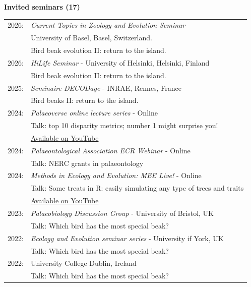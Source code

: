 \documentclass[10pt,a4paper]{article}
\begin{document}
{\raggedright\textbf{Invited seminars (17)}\\[1.5ex]
\begin{tabular}{ll}
2026: & \textit{Current Topics in Zoology and Evolution Seminar} \\
      & University of Basel, Basel, Switzerland. \\
      & Bird beak evolution II: return to the island.\\
2026: & \textit{HiLife Seminar} - University of Helsinki, Helsinki, Finland \\
      & Bird beak evolution II: return to the island.\\
2025: & \textit{Seminaire DECODage} - INRAE, Rennes, France \\
      & Bird beaks II: return to the island.\\
2024: & \textit{Palaeoverse online lecture series} - Online \\
      & Talk: top 10 disparity metrics; number 1 might surprise you!\\
      & \href{https://www.youtube.com/watch?v=JKpUQbxID9A}{Available on YouTube}\\
2024: & \textit{Palaeontological Association ECR Webinar} - Online \\
      & Talk: NERC grants in palaeontology\\
2024: & \textit{Methods in Ecology and Evolution: MEE Live!} - Online \\
      & Talk: Some treats in R: easily simulating any type of trees and traits\\
      & \href{https://www.youtube.com/watch?v=QUhaFZxER2I}{Available on YouTube}\\
2023: & \textit{Palaeobiology Discussion Group} - University of Bristol, UK\\
      & Talk: Which bird has the most special beak?\\
2022: & \textit{Ecology and Evolution seminar series} - University if York, UK\\
      & Talk: Which bird has the most special beak?\\
2022: & University College Dublin, Ireland\\
      & Talk: Which bird has the most special beak?\\

\end{tabular}}
\end{document}
